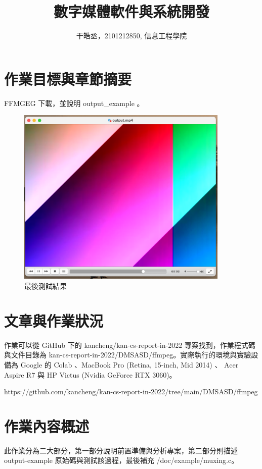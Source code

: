 \documentclass[10pt,UTF8]{ctexart}
\title{數字媒體軟件與系統開發}
\author{干皓丞，2101212850, 信息工程學院}
\begin{document}
\maketitle


\section{作業目標與章節摘要}

FFMGEG 下載，並說明 output\_example 。

\begin{figure}[H]
\centering 
\includegraphics[width=0.90\textwidth]{m1.png} 
\caption{最後測試結果}
\label{Test}
\end{figure}

\section{文章與作業狀況}

作業可以從 GitHub 下的 kancheng/kan-cs-report-in-2022 專案找到，作業程式碼與文件目錄為 kan-cs-report-in-2022/DMSASD/ffmpeg。實際執行的環境與實驗設備為 Google 的 Colab 、MacBook Pro (Retina, 15-inch, Mid 2014) 、 Acer Aspire R7 與 HP Victus (Nvidia GeForce RTX 3060)。

https://github.com/kancheng/kan-cs-report-in-2022/tree/main/DMSASD/ffmpeg

\section{作業內容概述}

此作業分為二大部分，第一部分說明前置準備與分析專案，第二部分則描述 output-example 原始碼與測試該過程，最後補充 /doc/example/muxing.c。
\end{document}
